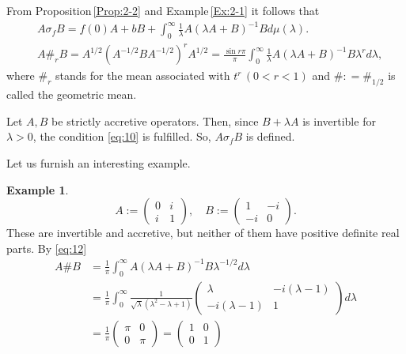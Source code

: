 \documentclass[reqno]{amsart}
\theoremstyle{definition}
\newtheorem{example}[theorem]{Example}
\theoremstyle{remark}
\begin{document}
From Proposition\,\ref{Prop:2-2} and Example\,\ref{Ex:2-1}
it follows that 
\begin{equation}\label{eq:12}
\begin{split}
&A\sigma_f B = f(0) A  + b B + \int_0^{\infty} 
\frac{1}{\lambda } A ( \lambda A + B)^{-1} B d\mu(\lambda).\\
&A\#_r B =A^{1/2} ( A^{-1/2} B A^{-1/2})^r A^{1/2}= 
 \frac{\sin r \pi}{\pi} \int_0^{\infty} 
 \frac{1}{\lambda}A (\lambda A + B)^{-1}B\lambda ^r d\lambda,
\end{split}
\end{equation}
where $\#_r$ stands for the mean associated with $t^r\,(0<r<1)$ and  
$\#: = \#_{1/2} $ is called the geometric mean. \par
Let $A, B$ be strictly accretive operators. 
Then, since $B+ \lambda A$ is invertible for $\lambda >0$, the condition 
\eqref{eq:10}
is fulfilled. So, $A\sigma_f B$ is defined. \par
Let us furnish an interesting example. 
\begin{example}
$$ A:=\begin{pmatrix} 0 & i \\ i & 1\end{pmatrix},\quad 
B:=\begin{pmatrix} 1 & - i \\ - i & 0 \end{pmatrix}. $$
These are invertible and accretive, but neither of them have 
positive definite real parts. By \eqref{eq:12}
\begin{align*}
A \# B &= \frac{1}{\pi} \int_0^{\infty} 
A ( \lambda A + B)^{-1} B \lambda ^{-1/2} d\lambda \\
 &= \frac{1}{\pi}\int_0^{\infty}
\frac{1}{\sqrt{\lambda}(\lambda^2 - \lambda + 1)}
\begin{pmatrix}\lambda & -i(\lambda -1)\\ -i(\lambda -1)& 1 \end{pmatrix} 
d\lambda \\
&=\frac{1}{\pi} \begin{pmatrix} \pi & 0 \\ 0& \pi \end{pmatrix} =  
\begin{pmatrix} 1 & 0 \\ 0& 1 \end{pmatrix}
\end{align*}
\end{example}
\end{document}
